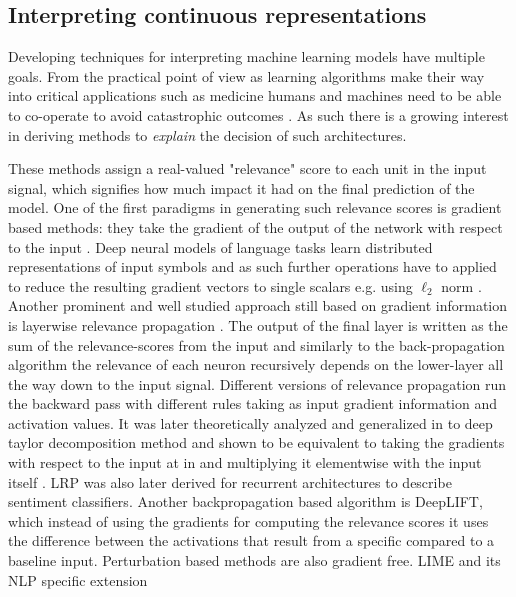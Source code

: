 \subsection{Interpreting continuous representations}
\label{sec:interpret}
Developing techniques for interpreting machine learning models have multiple goals. From the practical point of view as learning algorithms
make their way into critical applications such as medicine humans and machines need to be able to co-operate to avoid catastrophic outcomes \cite{caruana2015intelligible}.
As such there is a growing interest in deriving methods to \emph{explain} the decision of such architectures.

These methods assign a real-valued "relevance" score to each unit in the input signal, which signifies how much impact it had on the final prediction of the model.
One of the first paradigms in generating such relevance scores is gradient based methods: they take the gradient of the output of the network with respect to the input \cite{simonyan2013deep}.
Deep neural models of language tasks learn distributed representations of input symbols and as such further operations have to applied to reduce the resulting gradient vectors to
single scalars e.g. using $\ell_2$ norm \cite{bansal2016ask}. Another prominent and well studied approach still based on gradient information is layerwise
relevance propagation \cite{bach2015pixel}. The output of the final layer
is written as the sum of the relevance-scores from the input and similarly to the back-propagation algorithm the relevance of each neuron
recursively depends on the lower-layer all the way down to the input signal. Different versions of relevance propagation
run the backward pass with different rules taking as input gradient information and activation values. It
was later theoretically analyzed and generalized in to deep taylor decomposition method \cite{binder2016layer} and shown to be equivalent to taking the gradients with respect
to the input at in \citep{simonyan2013deep} and multiplying it elementwise with the input itself \cite{shrikumar2017learning}.
LRP was also later derived for recurrent architectures \cite{arras2017explaining} to describe sentiment classifiers.
Another backpropagation based algorithm is DeepLIFT, which instead of using the gradients for computing the relevance scores it uses the difference between the activations
that result from a specific compared  to a baseline input. Perturbation based methods are also gradient free. LIME \cite{ribeiro2016should} and its NLP specific extension
